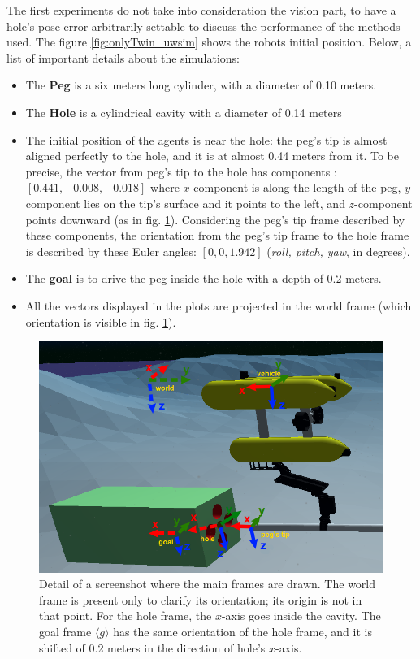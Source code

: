 The first experiments do not take into consideration the vision part, to have a hole's pose error arbitrarily settable to discuss the performance of the methods used. The figure \ref{fig:onlyTwin_uwsim} shows the robots initial position. Below, a list of important details about the simulations:
\begin{itemize}
	\item The \textbf{Peg} is a six meters long cylinder, with a diameter of 0.10 meters.
	\item The \textbf{Hole} is a cylindrical cavity with a diameter of 0.14 meters
	\item The initial position of the agents is near the hole: the peg's tip is almost aligned perfectly to the hole, and it is at almost 0.44 meters from it. To be precise, the vector from peg's tip to the hole has components : $[0.441, -0.008, -0.018]$ where $x$-component is along the length of the peg, $y$-component lies on the tip's surface and it points to the left, and $z$-component points downward (as in fig. \ref{fig:scenario_frames}). Considering the peg's tip frame described by these components, the orientation from the peg's tip frame to the hole frame is described by these Euler angles: $[0, 0, 1.942]$ (\textit{roll, pitch, yaw}, in degrees).
	\item The \textbf{goal} is to drive the peg inside the hole with a depth of 0.2 meters.
	\item All the vectors displayed in the plots are projected in the world frame (which orientation is visible in fig. \ref{fig:scenario_frames}).
\end{itemize}
\begin{figure}[H]
	\centering
	\includegraphics[width=12cm]{scenario_framesCrop.png}	
	\caption[Scenario with the main frames]{Detail of a screenshot where the main frames are drawn. The world frame is present only to clarify its orientation; its origin is not in that point. For the hole frame, the $x$-axis goes inside the cavity. The goal frame $\langle g \rangle$ has the same orientation of the hole frame, and it is shifted of 0.2 meters in the direction of hole's $x$-axis.}
	\label{fig:scenario_frames}
\end{figure}


